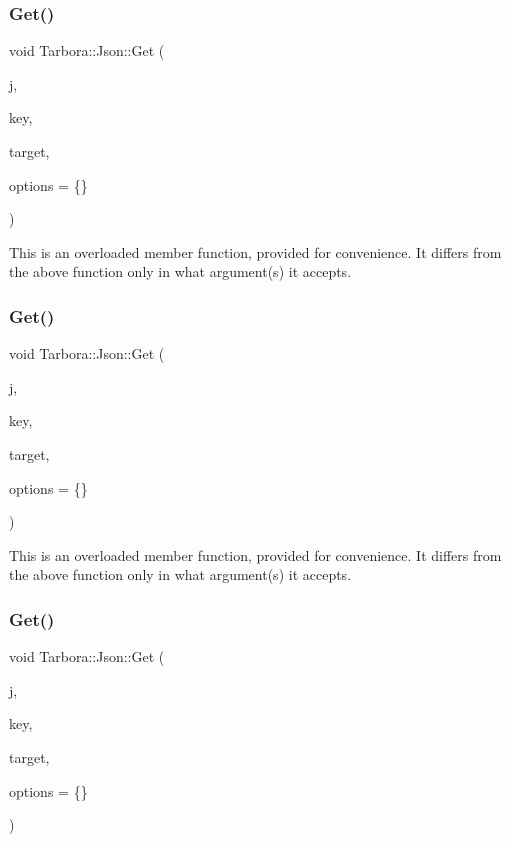 \subsubsection{\texorpdfstring{Get()}{Get()}\hspace{0.1cm}{\footnotesize\ttfamily [12/18]}}
{\footnotesize\ttfamily void Tarbora\+::\+Json\+::\+Get (\begin{DoxyParamCaption}\item[{raw\+\_\+json}]{j,  }\item[{const char $\ast$}]{key,  }\item[{std\+::string $\ast$}]{target,  }\item[{\hyperlink{structTarbora_1_1JsonOptions}{Json\+Options}}]{options = {\ttfamily \{\}} }\end{DoxyParamCaption})}

This is an overloaded member function, provided for convenience. It differs from the above function only in what argument(s) it accepts. \mbox{\label{classTarbora_1_1Json_a0f7f0bb14cb1f52afab3c9e44b5b46fc}} 
\subsubsection{\texorpdfstring{Get()}{Get()}\hspace{0.1cm}{\footnotesize\ttfamily [13/18]}}
{\footnotesize\ttfamily void Tarbora\+::\+Json\+::\+Get (\begin{DoxyParamCaption}\item[{raw\+\_\+json}]{j,  }\item[{int}]{key,  }\item[{raw\+\_\+json $\ast$}]{target,  }\item[{\hyperlink{structTarbora_1_1JsonOptions}{Json\+Options}}]{options = {\ttfamily \{\}} }\end{DoxyParamCaption})}

This is an overloaded member function, provided for convenience. It differs from the above function only in what argument(s) it accepts. \mbox{\label{classTarbora_1_1Json_a26d06b09cfa1ce6a53d9ad9dc19b0b5f}} 
\subsubsection{\texorpdfstring{Get()}{Get()}\hspace{0.1cm}{\footnotesize\ttfamily [14/18]}}
{\footnotesize\ttfamily void Tarbora\+::\+Json\+::\+Get (\begin{DoxyParamCaption}\item[{raw\+\_\+json}]{j,  }\item[{int}]{key,  }\item[{bool $\ast$}]{target,  }\item[{\hyperlink{structTarbora_1_1JsonOptions}{Json\+Options}}]{options = {\ttfamily \{\}} }\end{DoxyParamCaption})}

